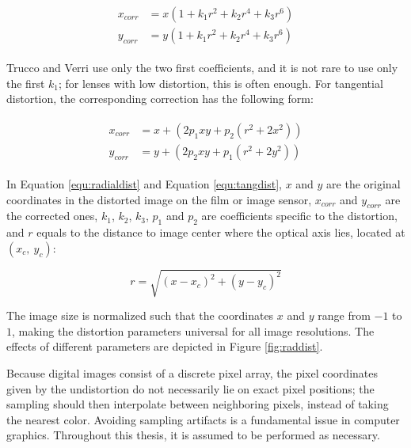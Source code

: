 \begin{align} \label{equ:radialdist} \begin{split}
	x_{corr} &= x(1 + k_1 r^2 + k_2 r^4 + k_3 r^6)\\
	y_{corr} &= y(1 + k_1 r^2 + k_2 r^4 + k_3 r^6)
\end{split} \end{align}

Trucco and Verri \cite{trucco1998introductory} use only the two first coefficients, and it is not rare to use only the first $k_1$; for lenses with low distortion, this is often enough.
For tangential distortion, the corresponding correction has the following form:

\begin{align} \label{equ:tangdist} \begin{split}
x_{corr} &= x + (2 p_1 x y + p_2 (r^2 + 2 x^2))\\
y_{corr} &= y + (2 p_2 x y + p_1 (r^2 + 2 y^2))
\end{split} \end{align}

In Equation \ref{equ:radialdist} and Equation \ref{equ:tangdist}, $x$ and $y$ are the original coordinates in the distorted image on the film or image sensor, $x_{corr}$ and $y_{corr}$ are the corrected ones, $k_1$, $k_2$, $k_3$, $p_1$ and $p_2$ are coefficients specific to the distortion, and $r$ equals to the distance to image center where the optical axis lies, located at $(x_c,~y_c)$:

\begin{equation}
r = \sqrt{(x - x_c)^2 + (y - y_c)^2}
\end{equation}


The image size is normalized such that the coordinates $x$ and $y$ range from $-1$ to $1$, making the distortion parameters universal for all image resolutions.
The effects of different parameters are depicted in Figure \ref{fig:raddist}.


Because digital images consist of a discrete pixel array, the pixel coordinates given by the undistortion do not necessarily lie on exact pixel positions; the sampling should then interpolate between neighboring pixels, instead of taking the nearest color.
Avoiding sampling artifacts is a fundamental issue in computer graphics.
\cite{wolberg1990digital}
Throughout this thesis, it is assumed to be performed as necessary.

